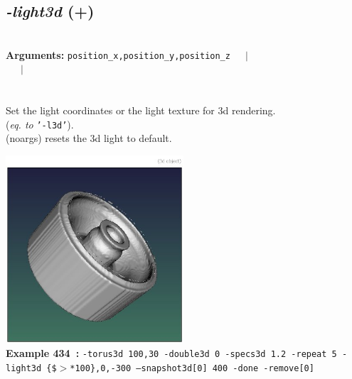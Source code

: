 \documentclass[a4paper,11pt,twoside]{book}
\begin{document}
\subsection{\emph{-light3d} (+)}\vspace*{-0.5em}
~\\\textbf{Arguments: } 
{\small \texttt{position\_x,position\_y,position\_z}}~~~$|$\\
\hspace*{2.2cm}{\small \texttt{[texture]}}~~~$|$\\
\\~\\
Set the light coordinates or the light texture for 3d rendering.
~\\(\emph{eq. to} {\small \texttt{'-l3d'}}).
~\\(noargs) resets the 3d light to default.
\begin{center}\includegraphics[keepaspectratio=true,height=7cm,width=\textwidth]{img/gmic_def434.jpg}\\
{\footnotesize \textbf{Example 434~:} \texttt{-torus3d 100,30 -double3d 0 -specs3d 1.2 -repeat 5 -light3d \{\$$>$*100\},0,-300 --snapshot3d[0] 400 -done -remove[0]}}
\end{center}
\end{document}
